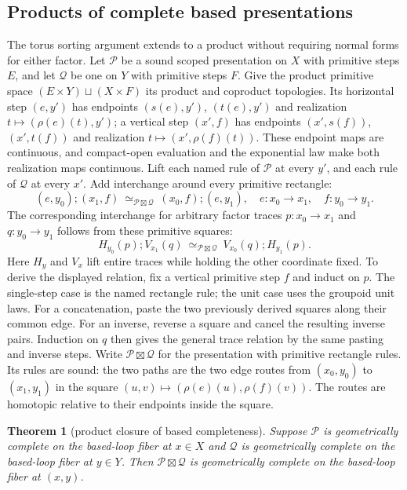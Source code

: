 \documentclass[10pt,reqno]{amsart}
\theoremstyle{definition}
\theoremstyle{plain}
\newtheorem{theorem}[definition]{Theorem}
\theoremstyle{remark}
\begin{document}
\subsection{Products of complete based presentations}

The torus sorting argument extends to a product without requiring normal
forms for either factor.  Let $\mathcal P$ be a sound scoped presentation
on $X$ with primitive steps $E$, and let $\mathcal Q$ be one on $Y$ with
primitive steps $F$. Give the product primitive space
$(E\times Y)\sqcup(X\times F)$ its product and coproduct topologies.
Its horizontal step $(e,y')$ has endpoints $(s(e),y')$, $(t(e),y')$
and realization $t\mapsto(\rho(e)(t),y')$; a vertical step $(x',f)$
has endpoints $(x',s(f))$, $(x',t(f))$ and realization
$t\mapsto(x',\rho(f)(t))$. These endpoint maps are continuous, and
compact-open evaluation and the exponential law make both realization
maps continuous. Lift each
named rule of $\mathcal P$ at every $y'$, and each rule of $\mathcal Q$ at
every $x'$.  Add interchange around every primitive rectangle:
\[
 (e,y_0);(x_1,f)\ \simeq_{\mathcal P\boxtimes\mathcal Q}\
 (x_0,f);(e,y_1),
 \quad e:x_0\to x_1,\quad f:y_0\to y_1.
\]
The corresponding interchange for arbitrary factor traces $p:x_0\to x_1$
and $q:y_0\to y_1$ follows from these primitive squares:
\[
 H_{y_0}(p);V_{x_1}(q)\ \simeq_{\mathcal P\boxtimes\mathcal Q}\
 V_{x_0}(q);H_{y_1}(p).
\]
Here $H_y$ and $V_x$ lift entire traces while holding the other coordinate
fixed. To derive the displayed relation, fix a vertical primitive step
$f$ and induct on $p$. The single-step case is the named rectangle rule;
the unit case uses the groupoid unit laws. For a concatenation, paste the
two previously derived squares along their common edge. For an inverse,
reverse a square and cancel the resulting inverse pairs. Induction on $q$
then gives the general trace relation by the same pasting and inverse steps.
Write $\mathcal P\boxtimes\mathcal Q$ for the presentation with primitive
rectangle rules. Its rules are sound: the two paths are the two edge routes from $(x_0,y_0)$
to $(x_1,y_1)$ in the square
$(u,v)\mapsto(\rho(e)(u),\rho(f)(v))$.  The routes are homotopic relative
to their endpoints inside the square.

\begin{theorem}[product closure of based completeness]
\label{thm:product-completeness}
Suppose $\mathcal P$ is geometrically complete on the based-loop fiber at
$x\in X$ and $\mathcal Q$ is geometrically complete on the based-loop
fiber at $y\in Y$.  Then $\mathcal P\boxtimes\mathcal Q$ is geometrically
complete on the based-loop fiber at $(x,y)$.
\end{theorem}
\end{document}

